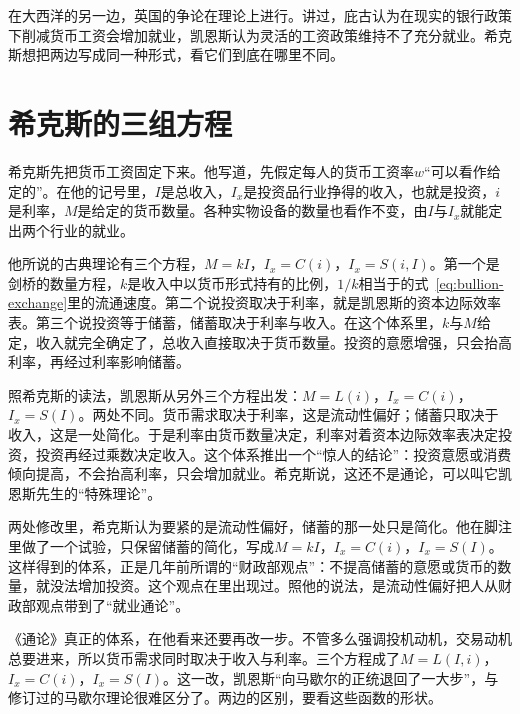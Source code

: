 在大西洋的另一边，英国的争论在理论上进行。讲过，庇古认为在现实的银行政策下削减货币工资会增加就业，凯恩斯认为灵活的工资政策维持不了充分就业。希克斯想把两边写成同一种形式，看它们到底在哪里不同\cite{hicks1937}。

\section{希克斯的三组方程}\label{sec:islm-hicks}

希克斯先把货币工资固定下来。他写道，先假定每人的货币工资率$w$“可以看作给定的”\cite{hicks1937}。在他的记号里，$I$是总收入，$I_x$是投资品行业挣得的收入，也就是投资，$i$是利率，$M$是给定的货币数量\cite{hicks1937}。各种实物设备的数量也看作不变，由$I$与$I_x$就能定出两个行业的就业\cite{hicks1937}。

他所说的古典理论有三个方程，$M=kI$，$I_x=C(i)$，$I_x=S(i,I)$\cite{hicks1937}。第一个是剑桥的数量方程，$k$是收入中以货币形式持有的比例，$1/k$相当于的式~\eqref{eq:bullion-exchange}里的流通速度。第二个说投资取决于利率，就是凯恩斯的资本边际效率表。第三个说投资等于储蓄，储蓄取决于利率与收入\cite{hicks1937}。在这个体系里，$k$与$M$给定，收入就完全确定了，总收入直接取决于货币数量\cite{hicks1937}。投资的意愿增强，只会抬高利率，再经过利率影响储蓄\cite{hicks1937}。

照希克斯的读法，凯恩斯从另外三个方程出发：$M=L(i)$，$I_x=C(i)$，$I_x=S(I)$\cite{hicks1937}。两处不同。货币需求取决于利率，这是流动性偏好；储蓄只取决于收入，这是一处简化\cite{hicks1937}。于是利率由货币数量决定，利率对着资本边际效率表决定投资，投资再经过乘数决定收入\cite{hicks1937}。这个体系推出一个“惊人的结论”：投资意愿或消费倾向提高，不会抬高利率，只会增加就业\cite{hicks1937}。希克斯说，这还不是通论，可以叫它凯恩斯先生的“特殊理论”\cite{hicks1937}。

两处修改里，希克斯认为要紧的是流动性偏好，储蓄的那一处只是简化\cite{hicks1937}。他在脚注里做了一个试验，只保留储蓄的简化，写成$M=kI$，$I_x=C(i)$，$I_x=S(I)$\cite{hicks1937}。这样得到的体系，正是几年前所谓的“财政部观点”：不提高储蓄的意愿或货币的数量，就没法增加投资\cite{hicks1937}。这个观点在里出现过。照他的说法，是流动性偏好把人从财政部观点带到了“就业通论”\cite{hicks1937}。

《通论》真正的体系，在他看来还要再改一步。不管多么强调投机动机，交易动机总要进来，所以货币需求同时取决于收入与利率\cite{hicks1937}。三个方程成了$M=L(I,i)$，$I_x=C(i)$，$I_x=S(I)$\cite{hicks1937}。这一改，凯恩斯“向马歇尔的正统退回了一大步”，与修订过的马歇尔理论很难区分了\cite{hicks1937}。两边的区别，要看这些函数的形状。

